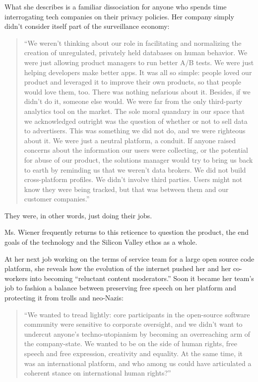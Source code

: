 What she describes is a familiar dissociation for anyone who spends time
interrogating tech companies on their privacy policies. Her company
simply didn't consider itself part of the surveillance economy:

\begin{quote}
``We weren't thinking about our role in facilitating and normalizing the
creation of unregulated, privately held databases on human behavior. We
were just allowing product managers to run better A/B tests. We were
just helping developers make better apps. It was all so simple: people
loved our product and leveraged it to improve their own products, so
that people would love them, too. There was nothing nefarious about it.
Besides, if we didn't do it, someone else would. We were far from the
only third-party analytics tool on the market. The sole moral quandary
in our space that we acknowledged outright was the question of whether
or not to sell data to advertisers. This was something we did not do,
and we were righteous about it. We were just a neutral platform, a
conduit. If anyone raised concerns about the information our users were
collecting, or the potential for abuse of our product, the solutions
manager would try to bring us back to earth by reminding us that we
weren't data brokers. We did not build cross-platform profiles. We
didn't involve third parties. Users might not know they were being
tracked, but that was between them and our customer companies.''
\end{quote}

They were, in other words, just doing their jobs.

Ms. Wiener frequently returns to this reticence to question the product,
the end goals of the technology and the Silicon Valley ethos as a whole.

At her next job working on the terms of service team for a large open
source code platform, she reveals how the evolution of the internet
pushed her and her co-workers into becoming ``reluctant content
moderators.'' Soon it became her team's job to fashion a balance between
preserving free speech on her platform and protecting it from trolls and
neo-Nazis:

\begin{quote}
``We wanted to tread lightly: core participants in the open-source
software community were sensitive to corporate oversight, and we didn't
want to undercut anyone's techno-utopianism by becoming an overreaching
arm of the company-state. We wanted to be on the side of human rights,
free speech and free expression, creativity and equality. At the same
time, it was an international platform, and who among us could have
articulated a coherent stance on international human rights?''
\end{quote}

